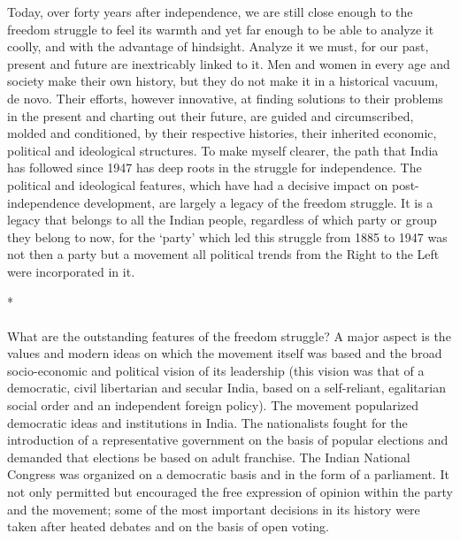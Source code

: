 Today, over forty years after independence, we are still close enough to the freedom struggle to feel its warmth and yet far enough to be able to analyze it coolly, and with the advantage of hindsight. Analyze it we must, for our past, present and future are inextricably linked to it. Men and women in every age and society make their own history, but they do not make it in a historical vacuum, de novo. Their efforts, however innovative, at finding solutions to their problems in the present and charting out their future, are guided and circumscribed, molded and conditioned, by their respective histories, their inherited economic, political and ideological structures. To make myself clearer, the path that India has followed since 1947 has deep roots in the struggle for independence. The political and ideological features, which have had a decisive impact on post-independence development, are largely a legacy of the freedom struggle. It is a legacy that belongs to all the Indian people, regardless of which party or group they belong to now, for the `party' which led this struggle from 1885 to 1947 was not then a party but a movement all political trends from the Right to the Left were incorporated in it.

\begin{center}*\end{center}

\paragraph*{}
What are the outstanding features of the freedom struggle? A major aspect is the values and modern ideas on which the movement itself was based and the broad socio-economic and political vision of its leadership (this vision was that of a democratic, civil libertarian and secular India, based on a self-reliant, egalitarian social order and an independent foreign policy). The movement popularized democratic ideas and institutions in India. The nationalists fought for the introduction of a representative government on the basis of popular elections and demanded that elections be based on adult franchise. The Indian National Congress was organized on a democratic basis and in the form of a parliament. It not only permitted but encouraged the free expression of opinion within the party and the movement; some of the most important decisions in its history were taken after heated debates and on the basis of open voting.

